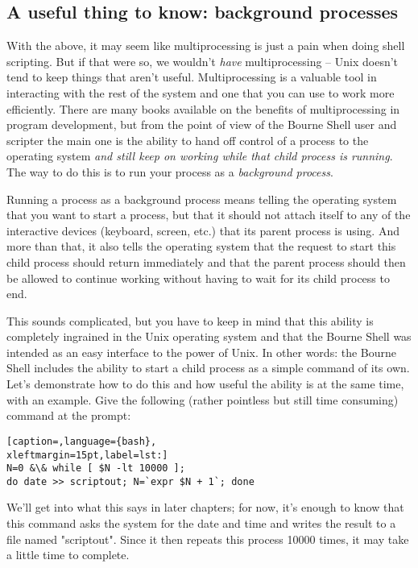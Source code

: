 \subsection{A useful thing to know: background processes}
With the above, it may seem like multiprocessing is just a pain when doing
shell scripting. But if that were so, we wouldn't \textit{have} multiprocessing
-- Unix doesn't tend to keep things that aren't useful. Multiprocessing is a
valuable tool in interacting with the rest of the system and one that you can
use to work more efficiently. There are many books available on the benefits of
multiprocessing in program development, but from the point of view of the
Bourne Shell user and scripter the main one is the ability to hand off control
of a process to the operating system \textit{and still keep on working while
that child process is running}. The way to do this is to run your process as a
\textit{background process}.

Running a process as a background process means telling the operating system
that you want to start a process, but that it should not attach itself to any
of the interactive devices (keyboard, screen, etc.) that its parent process is
using. And more than that, it also tells the operating system that the request
to start this child process should return immediately and that the parent
process should then be allowed to continue working without having to wait for
its child process to end.

This sounds complicated, but you have to keep in mind that this ability is
completely ingrained in the Unix operating system and that the Bourne Shell was
intended as an easy interface to the power of Unix. In other words: the Bourne
Shell includes the ability to start a child process as a simple command of its
own. Let's demonstrate how to do this and how useful the ability is at the same
time, with an example. Give the following (rather pointless but still time
consuming) command at the prompt:
\lstset{basicstyle=\scriptsize, numbers=left, captionpos=b, tabsize=4}
\begin{lstlisting}[caption=,language={bash},
xleftmargin=15pt,label=lst:]
N=0 &\& while [ $N -lt 10000 ];
do date >> scriptout; N=`expr $N + 1`; done
\end{lstlisting}

We'll get into what this says in later chapters; for now, it's enough to know
that this command asks the system for the date and time and writes the result
to a file named "scriptout". Since it then repeats this process 10000 times, it
may take a little time to complete.


